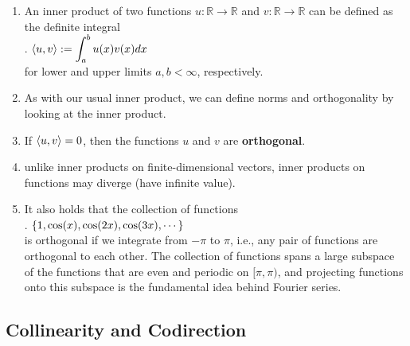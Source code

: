 \begin{enumerate}
    \item An inner product of two functions $u : \mathbb{R} \to \mathbb{R}$ and $v : \mathbb{R} \to \mathbb{R}$ can be defined as the definite integral
    \hfill \cite{mfml/book/mml/Deisenroth-Faisal-Ong}
    \\
    .\hfill
    $
        \langle u, v\rangle
        := \displaystyle\int^b_a u(x)v(x) dx
    $
    \hfill \cite{mfml/book/mml/Deisenroth-Faisal-Ong}
    \\
    for lower and upper limits $a, b < \infty$, respectively.
    \hfill \cite{mfml/book/mml/Deisenroth-Faisal-Ong}

    \item As with our usual inner product, we can define norms and orthogonality by looking at the inner product.
    \hfill \cite{mfml/book/mml/Deisenroth-Faisal-Ong}

    \item If $\langle u, v\rangle = 0$, then the functions $u$ and $v$ are \textbf{orthogonal}.
    \hfill \cite{mfml/book/mml/Deisenroth-Faisal-Ong}

    \item unlike inner products on finite-dimensional vectors, inner products on functions may diverge (have infinite value).
    \hfill \cite{mfml/book/mml/Deisenroth-Faisal-Ong}

    \item It also holds that the collection of functions
    \hfill \cite{mfml/book/mml/Deisenroth-Faisal-Ong}
    \\
    .\hfill
    $
        \left\{1, \cos(x), \cos(2x), \cos(3x), \cdots \right\}
    $
    \hfill \cite{mfml/book/mml/Deisenroth-Faisal-Ong}
    \\
    is orthogonal if we integrate from $-\pi$ to $\pi$, i.e., any pair of functions are orthogonal to each other.
    The collection of functions spans a large subspace of the functions that are even and periodic on $[\pi, \pi)$, and projecting functions onto this subspace is the fundamental idea behind Fourier series.
    \hfill \cite{mfml/book/mml/Deisenroth-Faisal-Ong}

    
\end{enumerate}










\subsection{Collinearity and Codirection}

